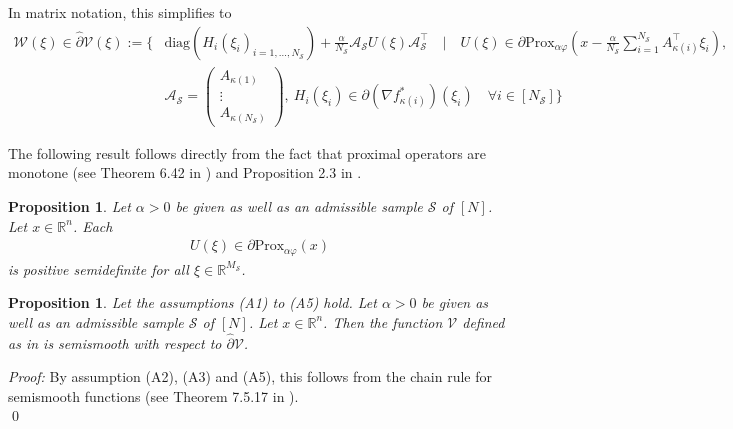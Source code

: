 \documentclass[12pt,a4paper,twoside]{article}
\makeatletter
\renewcommand*{\eqref}[1]{%
	\hyperref[{#1}]{\textup{\tagform@{\ref*{#1}}}}%
}
\theoremstyle{plain}
\newtheorem{prop}[thm]{Proposition}
\theoremstyle{note}
\numberwithin{thm}{section}
\newcommand{\trp}[1]{#1^{\intercal}}
\newcommand{\prox}[2]{\text{Prox}_{#1}\left(#2\right)}
\newcommand{\ixmap}[1]{{\kappa(#1)}}
\let\temp\phi
\let\phi\varphi
\let\varphi\temp
\makeatother
\begin{document}
	In matrix notation, this simplifies to 
	\begin{align*}
		\mathcal{W}(\xi) \in \hat{\partial} \mathcal{V}(\xi) := \Bigg\{&\text{diag}\left(H_i(\xi_i)_{i = 1, \dots, N_\mathcal{S}}\right) + \frac{\alpha}{N_{\mathcal{S}}} \mathcal{A}_\mathcal{S}  U(\xi) \trp{\mathcal{A}_\mathcal{S}} \quad \Bigg \vert \quad U(\xi) \in \partial \prox{\alpha \phi}{x - \frac{\alpha}{N_\mathcal{S}} \sum_{i=1}^{N_{\mathcal{S}}} A_\ixmap{i}^\intercal \xi_i},\\
		&\mathcal{A}_\mathcal{S} = \begin{pmatrix}A_\ixmap{1} \\ \vdots \\A_\ixmap{N_\mathcal{S}}\end{pmatrix}, ~
		H_i(\xi_i) \in \partial\left(\nabla f_\ixmap{i}^\ast\right)(\xi_i)
		\quad  \forall i \in [N_\mathcal{S}] \Bigg\}
	\end{align*}
	
	The following result follows directly from the fact that proximal operators are monotone (see Theorem 6.42 in \cite{Beck2017}) and Proposition 2.3 in \cite{Jiang1995}.\\
	
	\begin{prop}
		\label{prop:prox_phi_semidef}
		Let $\alpha >0$ be given as well as an admissible sample $\mathcal{S}$ of $[N]$. Let $x \in \mathbb{R}^n$. Each
		\begin{align*}
			U(\xi) \in \partial \prox{\alpha \phi}{x}
		\end{align*}
		is positive semidefinite for all $\xi \in \mathbb{R}^{M_\mathcal{S}}$.
	\end{prop}
	\vspace{10mm}
	\begin{prop}
		Let the assumptions (A1) to (A5) hold. Let $\alpha >0$ be given as well as an admissible sample $\mathcal{S}$ of $[N]$. Let $x \in \mathbb{R}^n$. Then the function $\mathcal{V}$ defined as in \eqref{eqn:definition_V} is semismooth with respect to $\hat{\partial} \mathcal{V}$.
	\end{prop}
	\textit{Proof:} By assumption (A2), (A3) and (A5), this follows from the chain rule for semismooth functions (see Theorem 7.5.17 in \cite{Facchinei2004}).\\
	\qed
	
\end{document}
